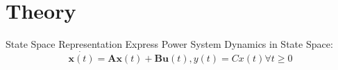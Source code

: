 \section[Theory]{Theory}
\label{sec:lasso_theory}

\begin{frame}[fragile]{State Space Representation}
	Express Power System Dynamics in State Space:
	\begin{equation}
		\label{eq:ssr}
		\dot{\textbf{x}(t)} = \textbf{A}\textbf{x}(t)
		+ \textbf{B}\textbf{u}(t), y(t) = Cx(t) \forall t\geq0
	\end{equation}
\end{frame}